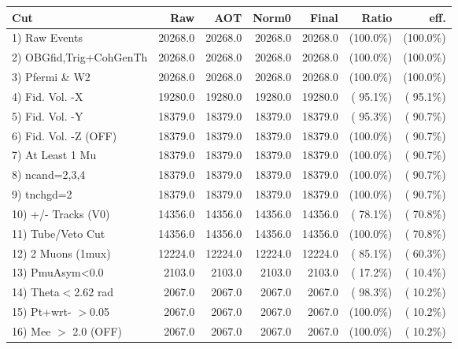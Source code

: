  \begin{table}[h!]\centering
 \begin{tabular}{||l||r|r|r|r|r|r||}
 \hline
 \hline
 Cut & Raw & AOT & Norm0 & Final & Ratio & eff.       \\
 \hline
  1) Raw Events           &      20268.0 &      20268.0 &      20268.0 &      20268.0 & (100.0\%) & (100.0\%) \\
  2) OBGfid,Trig+CohGenTh &      20268.0 &      20268.0 &      20268.0 &      20268.0 & (100.0\%) & (100.0\%) \\
  3) Pfermi \& W2         &      20268.0 &      20268.0 &      20268.0 &      20268.0 & (100.0\%) & (100.0\%) \\
  4) Fid. Vol. -X         &      19280.0 &      19280.0 &      19280.0 &      19280.0 & ( 95.1\%) & ( 95.1\%) \\
  5) Fid. Vol. -Y         &      18379.0 &      18379.0 &      18379.0 &      18379.0 & ( 95.3\%) & ( 90.7\%) \\
  6) Fid. Vol. -Z (OFF)   &      18379.0 &      18379.0 &      18379.0 &      18379.0 & (100.0\%) & ( 90.7\%) \\
  7) At Least 1 Mu        &      18379.0 &      18379.0 &      18379.0 &      18379.0 & (100.0\%) & ( 90.7\%) \\
  8) ncand=2,3,4          &      18379.0 &      18379.0 &      18379.0 &      18379.0 & (100.0\%) & ( 90.7\%) \\
  9) tnchgd=2             &      18379.0 &      18379.0 &      18379.0 &      18379.0 & (100.0\%) & ( 90.7\%) \\
 10) +/- Tracks (V0)      &      14356.0 &      14356.0 &      14356.0 &      14356.0 & ( 78.1\%) & ( 70.8\%) \\
 11) Tube/Veto Cut        &      14356.0 &      14356.0 &      14356.0 &      14356.0 & (100.0\%) & ( 70.8\%) \\
 12) 2 Muons (1mux)       &      12224.0 &      12224.0 &      12224.0 &      12224.0 & ( 85.1\%) & ( 60.3\%) \\
 13) PmuAsym<0.0          &       2103.0 &       2103.0 &       2103.0 &       2103.0 & ( 17.2\%) & ( 10.4\%) \\
 14) Theta$<$2.62 rad     &       2067.0 &       2067.0 &       2067.0 &       2067.0 & ( 98.3\%) & ( 10.2\%) \\
 15) Pt+wrt- $>$0.05      &       2067.0 &       2067.0 &       2067.0 &       2067.0 & (100.0\%) & ( 10.2\%) \\
 16) Mee $>$ 2.0  (OFF)   &       2067.0 &       2067.0 &       2067.0 &       2067.0 & (100.0\%) & ( 10.2\%) \\

\end{tabular}
\end{table}
